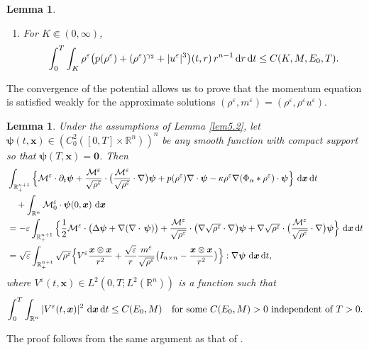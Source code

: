 \documentclass[reqno,11pt]{amsart}
\numberwithin{equation}{section}
\newtheorem{lemma}[theorem]{Lemma}
\theoremstyle{definition}
\def\v{\varepsilon}
\def\dd{{\, \rm d}}
\def\M{{\mathcal{M}}}
\def\bp{\boldsymbol{\psi}}
\begin{document}
\begin{lemma}
\begin{enumerate}
\vspace{0.3cm}
\item[{\rm(g)}] For $K \Subset (0,\infty)$,
\begin{align*}
\int_0^T\int_K  \rho^{\v} \big(p(\rho^{\v})+(\rho^{\v})^{\gamma_2} + |u^{\v}|^3 \big)(t,r)\, r^{n-1}\dd r \dd t
\leq C(K,M,E_0,T).
\end{align*}
\end{enumerate}
\end{lemma}

The convergence of the potential allows us to prove that the momentum equation is satisfied weakly for the approximate solutions $(\rho^\v,m^\v) = (\rho^\v,\rho^\v u^\v)$.

\begin{lemma}
Under the assumptions of {\rm Lemma {\rm \ref{lem5.2}}}, let $\bp(t,\boldsymbol{x})\in \left(C^2_0([0,T]\times \mathbb{R}^n)\right)^n$ be any smooth function with compact support
so that $\bp(T,\boldsymbol{x})=\boldsymbol{0}$. Then
\begin{align*}
	&\int_{\mathbb{R}_+^{n+1}} \Big\{\M^{\v} \cdot\partial_t\bp +\frac{\M^{\v}}{\sqrt{\rho^{\v}}} \cdot \big(\frac{\M^{\v}}{\sqrt{\rho^{\v}}}\cdot \nabla\big)\bp
	+p(\rho^{\v}) \nabla \cdot \bp -\kappa\rho^\v \nabla(\Phi_\alpha * \rho^\v)\cdot \bp\Big\}\,\dd\boldsymbol{x} \dd t\\
	&\quad +\int_{\mathbb{R}^n} \M_0^\v\cdot \bp(0,\boldsymbol{x})\,\dd\boldsymbol{x}
	\\
	&=-\v\int_{\mathbb{R}_+^{n+1}}
	\Big\{\frac{1}{2}\M^{\v}\cdot \big(\Delta \bp+\nabla(\nabla \cdot\,\bp) \big)
	+ \frac{\M^{\v}}{\sqrt{\rho^{\v}}} \cdot \big(\nabla\sqrt{\rho^{\v}}\cdot \nabla\big)\bp
    + \nabla\sqrt{\rho^{\v}}  \cdot \big(\frac{\M^{\v}}{\sqrt{\rho^{\v}}}\cdot \nabla\big)\bp\Big\}\,\dd\boldsymbol{x}\dd t\nonumber\\
	&=\sqrt{\v}\int_{\mathbb{R}_+^{n+1}}
	\sqrt{\rho^{\v}} \Big\{V^{\v}  \frac{\boldsymbol{x}\otimes\boldsymbol{x}}{r^2}
	+\frac{\sqrt{\v}}{r}\frac{m^\v}{\sqrt{\rho^\v}}\big(I_{n\times n}-\frac{\boldsymbol{x}\otimes\boldsymbol{x}}{r^2}\big)\Big\}: \nabla\bp\, \dd\boldsymbol{x}\dd t,
\end{align*}
where $V^{\v}(t,\boldsymbol{x})\in L^2(0,T; L^2(\mathbb{R}^n))$ is a function such that
$$
\displaystyle\int_0^T\int_{\mathbb{R}^n} |V^{\v}(t,\boldsymbol{x})|^2\, \dd\boldsymbol{x}\dd t\leq C(E_0,M)
\quad \mbox{for some $C(E_0,M)>0$ independent of $T>0$}.
$$
\end{lemma}

The proof follows from the same argument as that of \cite[Lemma 4.10]{Chen2021}.
\end{document}
